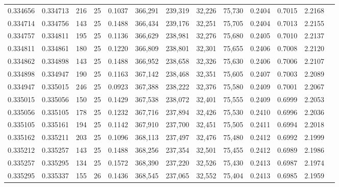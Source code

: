 \begin{tabular}{rrrrrrrrrrrrr}
0.334656 & 0.334713 &   216 &  25 &                                     0.1037 & 366,291 & 239,319 &  32,226 &  75,730 & 0.2404 & 0.7015 & 2.2168 \\
0.334714 & 0.334756 &   143 &  25 &                                     0.1488 & 366,434 & 239,176 &  32,251 &  75,705 & 0.2404 & 0.7013 & 2.2155 \\
0.334757 & 0.334811 &   195 &  25 &                                     0.1136 & 366,629 & 238,981 &  32,276 &  75,680 & 0.2405 & 0.7010 & 2.2137 \\
0.334811 & 0.334861 &   180 &  25 &                                     0.1220 & 366,809 & 238,801 &  32,301 &  75,655 & 0.2406 & 0.7008 & 2.2120 \\
0.334862 & 0.334898 &   143 &  25 &                                     0.1488 & 366,952 & 238,658 &  32,326 &  75,630 & 0.2406 & 0.7006 & 2.2107 \\
0.334898 & 0.334947 &   190 &  25 &                                     0.1163 & 367,142 & 238,468 &  32,351 &  75,605 & 0.2407 & 0.7003 & 2.2089 \\
0.334947 & 0.335015 &   246 &  25 &                                     0.0923 & 367,388 & 238,222 &  32,376 &  75,580 & 0.2409 & 0.7001 & 2.2067 \\
0.335015 & 0.335056 &   150 &  25 &                                     0.1429 & 367,538 & 238,072 &  32,401 &  75,555 & 0.2409 & 0.6999 & 2.2053 \\
0.335056 & 0.335105 &   178 &  25 &                                     0.1232 & 367,716 & 237,894 &  32,426 &  75,530 & 0.2410 & 0.6996 & 2.2036 \\
0.335105 & 0.335161 &   194 &  25 &                                     0.1142 & 367,910 & 237,700 &  32,451 &  75,505 & 0.2411 & 0.6994 & 2.2018 \\
0.335162 & 0.335211 &   203 &  25 &                                     0.1096 & 368,113 & 237,497 &  32,476 &  75,480 & 0.2412 & 0.6992 & 2.1999 \\
0.335212 & 0.335257 &   143 &  25 &                                     0.1488 & 368,256 & 237,354 &  32,501 &  75,455 & 0.2412 & 0.6989 & 2.1986 \\
0.335257 & 0.335295 &   134 &  25 &                                     0.1572 & 368,390 & 237,220 &  32,526 &  75,430 & 0.2413 & 0.6987 & 2.1974 \\
0.335295 & 0.335337 &   155 &  26 &                                     0.1436 & 368,545 & 237,065 &  32,552 &  75,404 & 0.2413 & 0.6985 & 2.1959 \\

\end{tabular}
